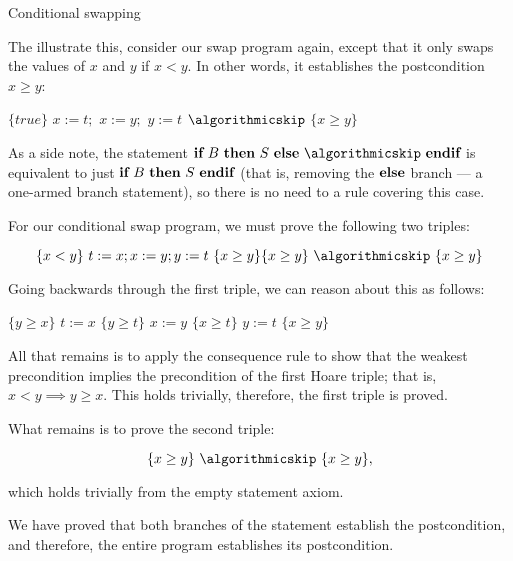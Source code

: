 \begin{example}{Conditional swapping}

The illustrate this, consider our swap program again, except that it only swaps the values of $x$ and $y$ if $x < y$. In other words, it establishes the postcondition $x \geq y$:

\begin{algorithmic}[0]
\State  $\{true\}$
  \State $x:=t;$
  \State $x:=y;$
  \State $y:=t$
\Else
  \State $\algorithmicskip$
\EndIf
\State $\{x \geq y\}$
\end{algorithmic}

As a side note, the statement $\algorithmicif\ B\ \algorithmicthen\ S\ \algorithmicelse\ \algorithmicskip\ \algorithmicend\algorithmicif$ is equivalent to just $\algorithmicif\ B\ \algorithmicthen\ S\ \algorithmicend\algorithmicif$ (that is, removing the $\algorithmicelse$ branch --- a one-armed branch statement), so there is no need to a rule covering this case.

For our conditional swap program, we must prove the following two triples:

\begin{displaymath}
\{x < y\}~ t:=x; x:=y; y:=t~\{x \geq y\}\\
\{x \geq y\}~\algorithmicskip~\{x \geq y\}
\end{displaymath}


Going backwards through the first triple, we can reason about this as follows:

\begin{algorithmic}[0]
\State $\{y \geq x\}$
\State $t:=x$
\State $\{y \geq t\}$
\State $x:=y$
\State $\{x \geq t\}$
\State $y:=t$
\State $\{x \geq y\}$
\end{algorithmic}

All that remains is to apply the consequence rule to show that the weakest precondition implies the precondition of the first Hoare triple; that is, $x < y \implies y \geq x$. This holds trivially, therefore, the first triple is proved.


What remains is to prove the second triple:

\begin{displaymath}
\{x \geq y\}~\algorithmicskip~\{x \geq y\},
\end{displaymath}

which holds trivially from the empty statement axiom.

We have proved that both branches of the statement establish the postcondition, and therefore, the entire program establishes its postcondition.

\end{example}

